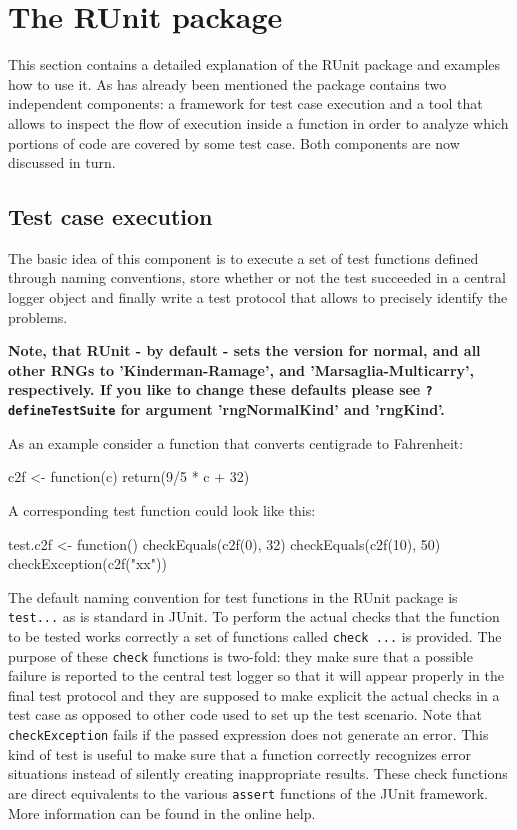 \documentclass[12pt, a4paper]{article}
\begin{document}
\section{The RUnit package}
\label{section:RUnitPackage}
This section contains a detailed explanation of the RUnit package and
examples how to use it. As has already been mentioned the package
contains two independent components: a framework for test case
execution and a tool that allows to inspect the flow of execution
inside a function in order to analyze which portions of code are
covered by some test case.
Both components are now discussed in turn.

\subsection{Test case execution}
\label{subsection:Testcaseexecution}
The basic idea of this component is to execute a set of test functions
defined through naming conventions, store whether or not the test
succeeded in a central logger object and finally write a test protocol
that allows to precisely identify the problems.

{\bf Note, that RUnit - by default - sets the version for normal, and all other RNGs to 'Kinderman-Ramage', and 'Marsaglia-Multicarry', respectively. If you like to change these defaults please see {\tt ?defineTestSuite} for argument 'rngNormalKind' and 'rngKind'.}

As an example consider a function that converts centigrade to
Fahrenheit:
\begin{Sinput}
c2f <- function(c) return(9/5 * c + 32)
\end{Sinput}
A corresponding test function could look like this:
\begin{Sinput}
test.c2f <- function() {
  checkEquals(c2f(0), 32)
  checkEquals(c2f(10), 50)
  checkException(c2f("xx"))
}
\end{Sinput}
The default naming convention for test functions in the RUnit package is {\tt test...} as is standard in JUnit. To perform the actual checks that the function to be tested works correctly a set of functions called {\tt check ...} is provided. The purpose of these {\tt check} functions is two-fold: they make sure that a possible failure is reported to the central test logger so that it will appear properly in the final test protocol and they are supposed to make explicit the actual checks in a test case as opposed to other code used to set up the test scenario. Note that {\tt checkException} fails if the passed expression does not generate an error. This kind of test is useful to make sure that a function correctly recognizes error situations instead of silently creating inappropriate results. These check functions are direct equivalents to the various {\tt assert} functions of the JUnit framework. More information can be found in the online help.
\end{document}

